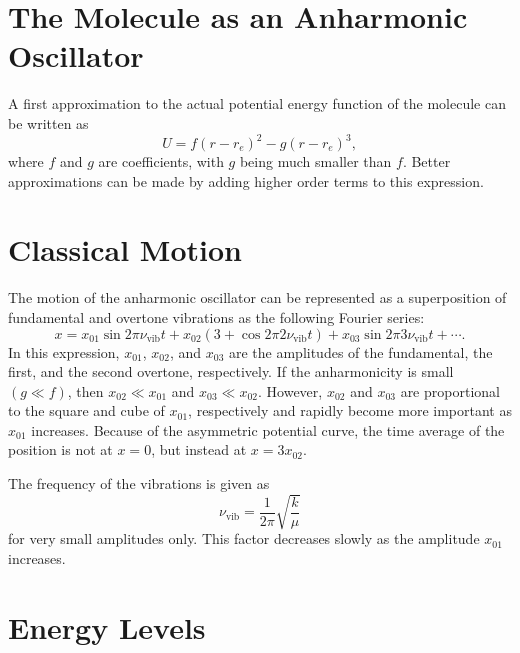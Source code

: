\documentclass[11pt, twoside, fleqn]{report}
\newcommand{\up}{\text}
\begin{document}
\section{The Molecule as an Anharmonic Oscillator}
\label{s:the_molecule_as_an_anharmonic_oscillator}

A first approximation to the actual potential energy function of the molecule can be written as
\begin{equation*}
    U = f(r - r_e)^2 - g(r - r_e)^3,
\end{equation*}
where $f$ and $g$ are coefficients, with $g$ being much smaller than $f$. Better approximations can be made by adding higher order terms to this expression.

\section{Classical Motion}
\label{s:classical_motion}

The motion of the anharmonic oscillator can be represented as a superposition of fundamental and overtone vibrations as the following Fourier series:
\begin{equation*}
    x = x_{01}\sin{2\pi\nu_\up{vib}t} + x_{02}(3 + \cos{2\pi2\nu_\up{vib}t}) + x_{03}\sin{2\pi3\nu_\up{vib}t} + \dotsb.
\end{equation*}
In this expression, $x_{01}$, $x_{02}$, and $x_{03}$ are the amplitudes of the fundamental, the first, and the second overtone, respectively. If the anharmonicity is small $(g \ll f)$, then $x_{02} \ll x_{01}$ and $x_{03} \ll x_{02}$. However, $x_{02}$ and $x_{03}$ are proportional to the square and cube of $x_{01}$, respectively and rapidly become more important as $x_{01}$ increases. Because of the asymmetric potential curve, the time average of the position is not at $x = 0$, but instead at $x = 3x_{02}$.

The frequency of the vibrations is given as
\begin{equation*}
    \nu_\up{vib} = \frac{1}{2\pi}\sqrt{\frac{k}{\mu}}
\end{equation*}
for very small amplitudes only. This factor decreases slowly as the amplitude $x_{01}$ increases.

\section{Energy Levels}
\label{s:energy_levels_3}
\end{document}
